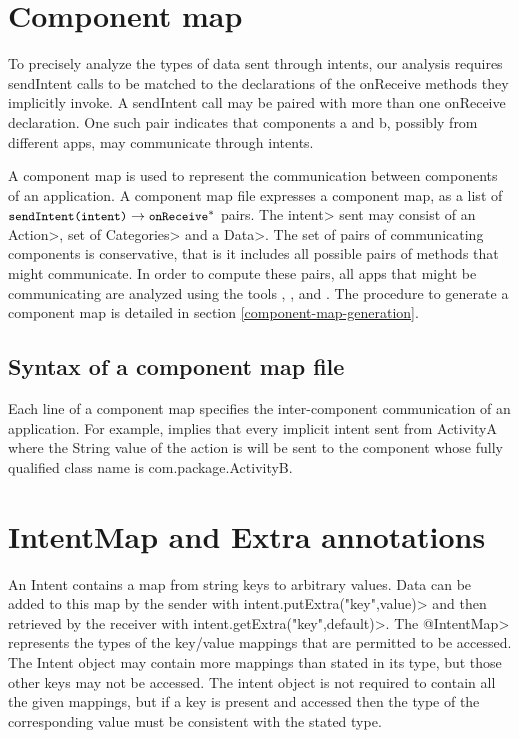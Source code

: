 \section{Component map}
To precisely analyze the types of data sent through intents, our analysis
requires sendIntent calls to be matched to the declarations of the onReceive
methods they implicitly invoke. A sendIntent call may be paired
with more than one onReceive declaration. One such pair indicates that 
components a and b, possibly from different apps, may communicate through 
intents. 

A component map is used to represent the communication between components of an
application. A component map file expresses a 
component map, as a list of $\flow{\|sendIntent(intent)|}{\|onReceive|^*}$ pairs.
The \<intent> sent may consist of an \<Action>, set of
\<Categories> and a \<Data>.
The set of pairs of communicating components is
conservative, that is it includes all possible pairs of methods that might
communicate. In order to compute these pairs, all apps that might be
communicating are analyzed using the tools , , and
. The procedure to generate a component map is detailed in section
\ref{component-map-generation}.


\subsection{Syntax of a component map file}
Each line of a component map specifies the inter-component communication of
an application. For example,  
implies that every implicit intent sent from ActivityA where the String value of
the action is  will
be sent to the component whose fully qualified class name is com.package.ActivityB.


\section{IntentMap and Extra annotations}
An Intent contains a map from string keys to arbitrary values. Data can be added
to this map by the sender with \<intent.putExtra("key",value)> and then
retrieved by the receiver with \<intent.getExtra("key",default)>. 
The \<@IntentMap> represents the types
of the key/value mappings that are permitted to be accessed. The Intent object
may contain more mappings than stated in its type, but those other keys may not
be accessed. The intent object is not required to contain all the given
mappings, but if a key is present and accessed 
then the type of the corresponding value must be consistent with the 
stated type. 

